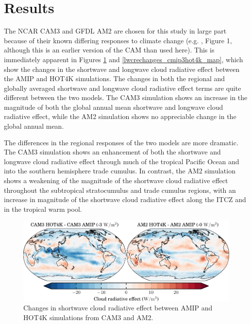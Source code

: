 \section{Results}
The NCAR CAM3 and GFDL AM2 are chosen for this study in large part because of their known differing responses to climate change (e.g. \cite{stephens_2005}, Figure 1, although this is an earlier version of the CAM than used here). This is immediately apparent in Figures \ref{swcrechanges_cmip3hot4k_map} and \ref{lwcrechanges_cmip3hot4k_map}, which show the changes in the shortwave and longwave cloud radiative effect between the AMIP and HOT4K simulations. The changes in both the regional and globally averaged shortwave and longwave cloud radiative effect terms are quite different between the two models. The CAM3 simulation shows an increase in the magnitude of both the global annual mean shortwave and longwave cloud radiative effect, while the AM2 simulation shows no appreciable change in the global annual mean. 

The differences in the regional responses of the two models are more dramatic. The CAM3 simulation shows an enhancement of both the shortwave and longwave cloud radiative effect through much of the tropical Pacific Ocean and into the southern hemisphere trade cumulus. In contrast, the AM2 simulation shows a weakening of the magnitude of the shortwave cloud radiative effect throughout the subtropical stratocumulus and trade cumulus regions, with an increase in magnitude of the shortwave cloud radiative effect along the ITCZ and in the tropical warm pool.

\begin{figure}
    \centering
    \includegraphics{../graphics/swcrechanges_cmip3hot4k_map.pdf}
    \caption{Changes in shortwave cloud radiative effect between AMIP and HOT4K simulations from CAM3 and AM2.}
    \label{swcrechanges_cmip3hot4k_map}
\end{figure}

